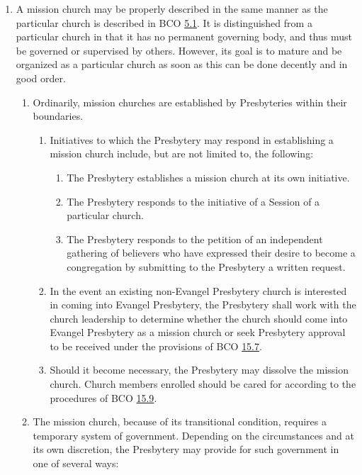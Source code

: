 \documentclass[
]{book}
\providecommand{\tightlist}{%
  \setlength{\itemsep}{0pt}\setlength{\parskip}{0pt}}
\begin{document}
\begin{enumerate}
\def\labelenumi{\arabic{enumi}.}
\tightlist
\item
  \protect\hypertarget{6}{\href{}{}}A mission church may be properly described in the same manner as the particular church is described in BCO \protect\hyperlink{5.1}{5.1}. It is distinguished from a particular church in that it has no permanent governing body, and thus must be governed or supervised by others. However, its goal is to mature and be organized as a particular church as soon as this can be done decently and in good order.

  \begin{enumerate}
  \def\labelenumii{\alph{enumii}.}
  \tightlist
  \item
    Ordinarily, mission churches are established by Presbyteries within their boundaries.

    \begin{enumerate}
    \def\labelenumiii{\roman{enumiii}.}
    \tightlist
    \item
      Initiatives to which the Presbytery may respond in establishing a mission church include, but are not limited to, the following:

      \begin{enumerate}
      \def\labelenumiv{\arabic{enumiv}.}
      \tightlist
      \item
        The Presbytery establishes a mission church at its own initiative.
      \item
        The Presbytery responds to the initiative of a Session of a particular church.
      \item
        The Presbytery responds to the petition of an independent gathering of believers who have expressed their desire to become a congregation by submitting to the Presbytery a written request.
      \end{enumerate}
    \item
      In the event an existing non-Evangel Presbytery church is interested in coming into Evangel Presbytery, the Presbytery shall work with the church leadership to determine whether the church should come into Evangel Presbytery as a mission church or seek Presbytery approval to be received under the provisions of BCO \protect\hyperlink{15.7}{15.7}.
    \item
      Should it become necessary, the Presbytery may dissolve the mission church. Church members enrolled should be cared for according to the procedures of BCO \protect\hyperlink{15.9}{15.9}.
    \end{enumerate}
  \item
    The mission church, because of its transitional condition, requires a temporary system of government. Depending on the circumstances and at its own discretion, the Presbytery may provide for such government in one of several ways:


\end{enumerate}
\end{enumerate}
\end{document}
